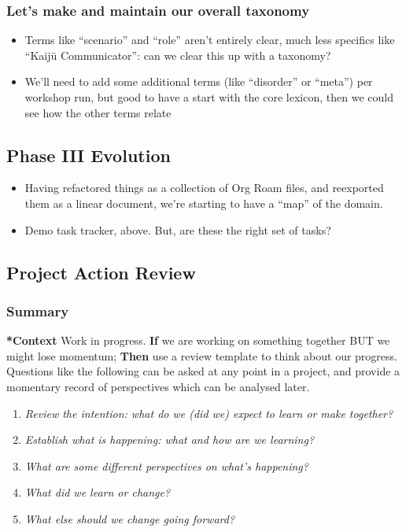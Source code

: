\documentclass{article}
\begin{document}
\subsubsection{Let’s make and maintain our overall taxonomy}

\begin{itemize}
\item Terms like “scenario” and “role” aren’t entirely clear, much less specifics like “Kaijū Communicator”: can we clear this up with a taxonomy?
\item We’ll need to add some additional terms (like “disorder” or “meta”) per workshop run, but good to have a start with the core lexicon, then we could see how the other terms relate
\end{itemize}

\subsection{Phase III Evolution}

\begin{itemize}
\item Having refactored things as a collection of Org Roam files, and reexported them as a linear document, we’re starting to have a ``map'' of the domain.
\item Demo task tracker, above.  But, are these the right set of tasks?
\end{itemize}
\subsection{Project Action Review}
\label{f5a1bc15-5abb-44d6-8f7a-e254974c9002}
\subsubsection{Summary}

\textbf{*Context} Work in progress. \textbf{If} we are working on something together
BUT we might lose momentum; \textbf{Then} use a review template to think about
our progress. Questions like the following can be asked at any point in
a project, and provide a momentary record of perspectives which can be
analysed later.

\begin{enumerate}
\item \emph{Review the intention: what do we (did we) expect to learn or make
together?}

\item \emph{Establish what is happening: what and how are we learning?}

\item \emph{What are some different perspectives on what's happening?}

\item \emph{What did we learn or change?}

\item \emph{What else should we change going forward?}
\end{enumerate}
\end{document}
